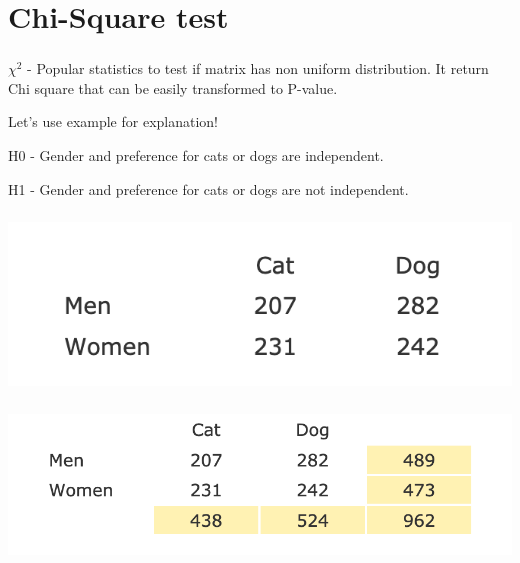 \documentclass[t, 11pt]{beamer}
\begin{document}
	\section{Chi-Square test}
			\begin{frame} 
		\frametitle{\insertsection} 
		$\chi^2$ - Popular statistics to test if matrix has non uniform distribution. It return Chi square that can be easily transformed to P-value. 
		
		Let's use example for explanation!
		
		\vspace{1cm}
		
		H0 - Gender and preference for cats or dogs are independent.
		
		H1 - Gender and preference for cats or dogs are not independent.
		
		
	\end{frame}

\begin{frame} 
	\frametitle{\insertsection} 	
	
	\begin{center}
		\includegraphics[scale=0.7]{chi1}
	\end{center}
	
\end{frame}

\begin{frame} 
	\frametitle{\insertsection} 	
	
	\begin{center}
		\includegraphics[scale=0.7]{chi2}
	\end{center}
	
\end{frame}
\end{document}
